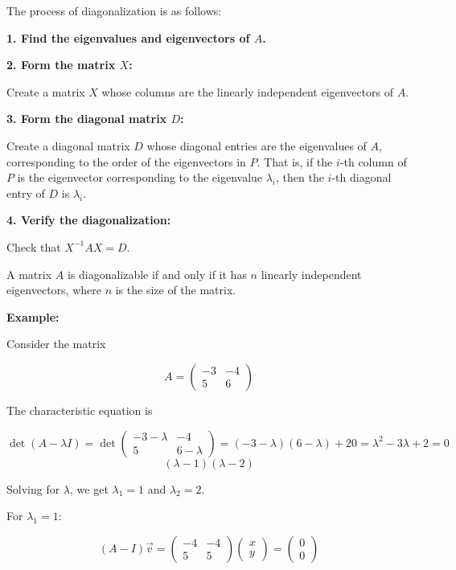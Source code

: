 The process of diagonalization is as follows:

\textbf{1. Find the eigenvalues and eigenvectors of \(A\).}

\textbf{2. Form the matrix \(X\):}

Create a matrix \(X\) whose columns are the linearly independent eigenvectors of \(A\).

\textbf{3. Form the diagonal matrix \(D\):} 

Create a diagonal matrix \(D\) whose diagonal entries are the eigenvalues of \(A\), corresponding to 
the order of the eigenvectors in \(P\). That is, if the \(i\)-th column of \(P\) is the eigenvector 
corresponding to the eigenvalue \(\lambda_i\), then the \(i\)-th diagonal entry of \(D\) is \(\lambda_i\).

\textbf{4. Verify the diagonalization:}
    
Check that \(X^{-1}AX = D\).

A matrix \(A\) is diagonalizable if and only if it has \(n\) linearly independent eigenvectors, where 
\(n\) is the size of the matrix.

\textbf{Example: }

Consider the matrix

\[
    A = \begin{pmatrix}
    -3 & -4 \\
    5 & 6
    \end{pmatrix}
\]

The characteristic equation is

\[
    \det(A - \lambda I) 
    = \det 
    \begin{pmatrix}
            -3 - \lambda & -4 \\
        5 & 6 - \lambda
    \end{pmatrix} 
    = (-3 - \lambda)(6 - \lambda) + 20 = \lambda^2 - 3\lambda + 2 = 0    
\]
\[
    (\lambda - 1)(\lambda - 2)
\]

Solving for \(\lambda\), we get \(\lambda_1 = 1\) and \(\lambda_2 = 2\).

For \(\lambda_1 = 1\):

\[
   (A - I)\vec{v} = \begin{pmatrix}
    -4 & -4 \\
    5 & 5
    \end{pmatrix} \begin{pmatrix}
    x \\
    y
    \end{pmatrix} = \begin{pmatrix}
    0 \\
    0
    \end{pmatrix}
\]

